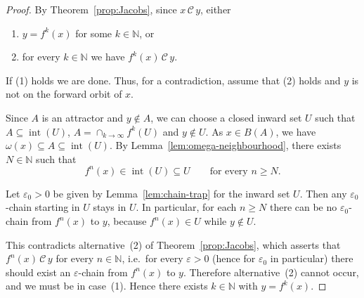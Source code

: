 \documentclass[10pt,a4paper]{article}
\theoremstyle{definition}
\theoremstyle{remark}
\theoremstyle{plain}
\begin{document}
\begin{proof}
    By Theorem~\ref{prop:Jacobs}, since $x\,\mathcal{C}\,y$, either
    \begin{enumerate}
        \item[(1)] $y=f^k(x)$ for some $k\in\mathbb{N}$, or
        \item[(2)] for every $k\in\mathbb{N}$ we have $f^k(x)\,\mathcal{C}\,y$.
    \end{enumerate}
    If (1) holds we are done. Thus, for a contradiction, assume that (2) holds
    and $y$ is not on the forward orbit of $x$.

    Since $A$ is an attractor and 
    $y\notin A$, we can choose a closed inward set $U$ such that  $A\subseteq \operatorname{int}(U)$, $A=\cap_{k\to \infty} f^k(U)$ and $y\notin U$. 
    As $x\in B(A)$, we have $\omega(x)\subseteq A\subseteq \operatorname{int}(U)$. By 
    Lemma~\ref{lem:omega-neighbourhood}, there exists $N\in\mathbb{N}$ such that
    $$
        f^n(x)\in \operatorname{int}(U) \subseteq U \qquad\text{for every }n\geq N.
    $$

    Let $\varepsilon_0>0$ be given by Lemma~\ref{lem:chain-trap} for the inward 
    set $U$. Then any $\varepsilon_0$-chain starting in $U$ stays in $U$. In 
    particular, for each $n\geq N$ there can be no $\varepsilon_0$-chain from 
    $f^n(x)$ to $y$, because $f^n(x)\in U$ while $y\notin U$.

    This contradicts alternative~(2) of Theorem~\ref{prop:Jacobs}, which 
    asserts that $f^n(x)\,\mathcal{C}\,y$ for every $n\in\mathbb{N}$, i.e.\ for 
    every $\varepsilon>0$ (hence for $\varepsilon_0$ in particular) there should 
    exist an $\varepsilon$-chain from $f^n(x)$ to $y$. Therefore alternative~(2) 
    cannot occur, and we must be in case~(1). Hence there exists $k\in\mathbb{N}$ 
    with $y=f^k(x)$.
\end{proof}
\end{document}
